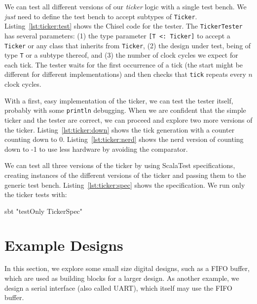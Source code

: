 \documentclass[%
    10pt,
    headinclude, footexclude,
    openright, %
    notitlepage,
    cleardoubleempty,
    headsepline,
    pointlessnumbers,
    bibtotoc, idxtotoc,
    ]{scrbook}
\newcommand{\code}[1]{{\small{\texttt{#1}}}}
\begin{document}
{We can test all different versions of our \emph{ticker} logic with a single test bench.
We \emph{just} need to define the test bench to accept subtypes of \code{Ticker}.
Listing~\ref{lst:ticker:test} shows the Chisel code for the tester.
The \code{TickerTester} has several parameters: (1) the type parameter
\code{[T <: Ticker]} to accept a \code{Ticker} or any class that inherits from \code{Ticker},
(2) the design under test, being of type \code{T} or a subtype thereof,
and (3) the number of clock cycles we expect for each tick.
The tester waits for the first occurrence of a tick (the start might be different for
different implementations) and then checks that \code{tick} repeats every $n$ clock cycles.


With a first, easy implementation of the ticker, we can test the tester
itself, probably with some \code{println} debugging. When we are confident that
the simple ticker and the tester are correct, we can proceed and explore
two more versions of the ticker. Listing~\ref{lst:ticker:down} shows the tick
generation with a counter counting down to 0.
Listing~\ref{lst:ticker:nerd} shows the nerd version of counting down to -1 to use
less hardware by avoiding the comparator.



We can test all three versions of the ticker by using ScalaTest specifications,
creating instances of the different versions of the ticker and passing them
to the generic test bench. Listing~\ref{lst:ticker:spec} shows the specification.
We run only the ticker tests with:
\begin{chisel}
sbt "testOnly TickerSpec"
\end{chisel}





\chapter{Example Designs}

In this section, we explore some small size digital designs, such as
a FIFO buffer, which are used as building blocks for a larger design.
As another example, we design a serial interface (also called UART),
which itself may use the FIFO buffer.

}
\end{document}
